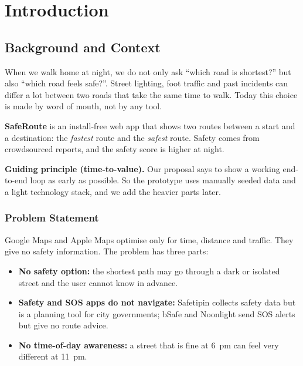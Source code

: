 \documentclass{tietreport}
\author{%
  \texttt{1024030176} Dhriti Handa \\
  \texttt{1024030180} Disha Kundra%
}
\begin{document}
\maketitle
\tableofcontents

\chapter{Introduction}

\section{Background and Context}

When we walk home at night, we do not only ask ``which road is
shortest?'' but also ``which road feels safe?''. Street lighting,
foot traffic and past incidents can differ a lot between two roads
that take the same time to walk. Today this choice is made by
word of mouth, not by any tool.

\textbf{SafeRoute} is an install-free web app that shows two routes
between a start and a destination: the \emph{fastest} route and the
\emph{safest} route. Safety comes from crowdsourced reports, and the
safety score is higher at night.

\textbf{Guiding principle (time-to-value).} Our proposal says to show
a working end-to-end loop as early as possible. So the prototype uses
manually seeded data and a light technology stack, and we add the
heavier parts later.

\subsection{Problem Statement}

Google Maps and Apple Maps optimise only for time, distance and
traffic. They give no safety information. The problem has three parts:

\begin{itemize}
  \item \textbf{No safety option:} the shortest path may go through a
    dark or isolated street and the user cannot know in advance.
  \item \textbf{Safety and SOS apps do not navigate:} Safetipin
    collects safety data but is a planning tool for city governments;
    bSafe and Noonlight send SOS alerts but give no route advice.
  \item \textbf{No time-of-day awareness:} a street that is fine at
    6~pm can feel very different at 11~pm.
\end{itemize}
\end{document}
